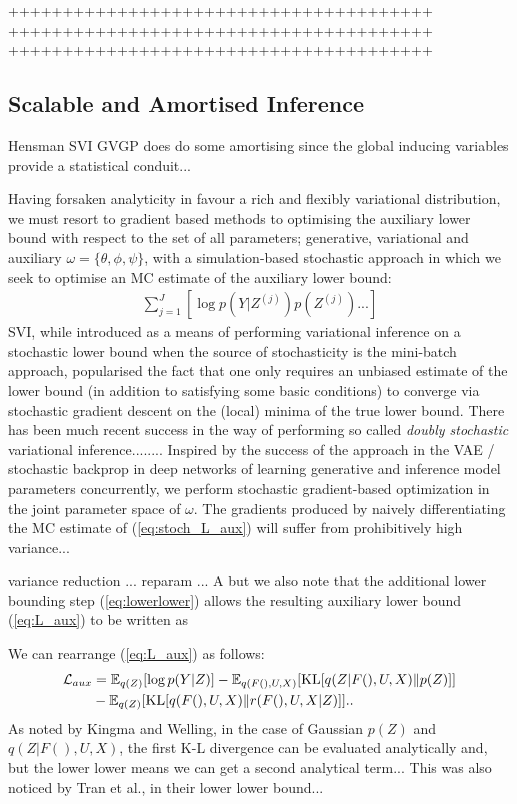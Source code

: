 \documentclass{article}
\begin{document}
+++++++++++++++++++++++++++++++++++++++
+++++++++++++++++++++++++++++++++++++++
+++++++++++++++++++++++++++++++++++++++

\subsection{Scalable and Amortised Inference}
\label{subsec:scale}

Hensman SVI GVGP does do some amortising since the global inducing variables provide a statistical conduit...

Having forsaken analyticity in favour a rich and flexibly variational distribution, we must resort to gradient based methods to optimising the auxiliary lower bound with respect to the set of all parameters; generative, variational and auxiliary $\omega=\{\theta,\phi,\psi\}$, with a simulation-based stochastic approach in which we seek to optimise an MC estimate of the auxiliary lower bound:
%
\begin{align}
  \sum_{j=1}^J [\log p(Y|Z^{(j)})p(Z^{(j)})...]\label{eq:stoch_L_aux}
\end{align}
%
SVI, while introduced as a means of performing variational inference on a stochastic lower bound when the source of stochasticity is the mini-batch approach, popularised the fact that one only requires an unbiased estimate of the lower bound (in addition to satisfying some basic conditions) to converge via stochastic gradient descent on the (local) minima of the true lower bound. There has been much recent success in the way of performing so called \emph{doubly stochastic} variational inference........
Inspired by the success of the approach in the VAE / stochastic backprop in deep networks of learning generative and inference model parameters concurrently, we perform stochastic gradient-based optimization in the joint parameter space of $\omega$. The gradients produced by naively differentiating the MC estimate of (\ref{eq:stoch_L_aux}) will suffer from prohibitively high variance...

variance reduction ... reparam ... A but we also note that the additional lower bounding step (\ref{eq:lowerlower}) allows the resulting auxiliary lower bound (\ref{eq:L_aux}) to be written as

We can rearrange (\ref{eq:L_aux}) as follows:
%
\begin{align}
  \mathcal{L}_{aux} &= \mathbb{E}_{q(Z)}[ \log p(Y|Z) ] - \mathbb{E}_{q(F(),U,X)}[ \text{KL}[q(Z|F(),U,X)\Vert p(Z)] ]\notag\\
  &- \mathbb{E}_{q(Z)}[ \text{KL}[q(F(),U,X)\Vert r(F(),U,X|Z)] ].\label{eq:L_aux_ABC}.
\end{align}
%
As noted by Kingma and Welling, in the case of Gaussian $p(Z)$ and $q(Z|F(),U,X)$, the first K-L divergence can be evaluated analytically and, but the lower lower means we can get a second analytical term... This was also noticed by Tran et al., in their lower lower bound...
\end{document}
